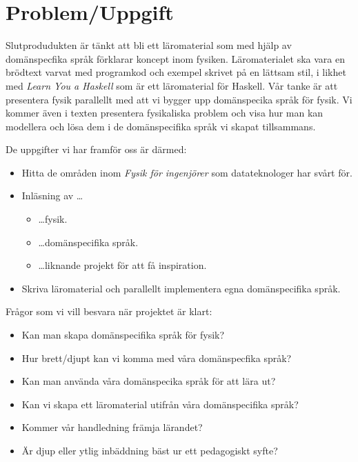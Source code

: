 \documentclass[12pt,a4paper]{article}
\begin{document}
\section{Problem/Uppgift}

Slutprodudukten är tänkt att bli ett läromaterial som med hjälp av domänspecfika språk förklarar koncept inom fysiken. Läromaterialet ska vara en brödtext varvat med programkod och exempel skrivet på en lättsam stil, i likhet med \textit{Learn You a Haskell}\cite{LYAH} som är ett läromaterial för Haskell. Vår tanke är att presentera fysik parallellt med att vi bygger upp domänspecika språk för fysik. Vi kommer även i texten presentera fysikaliska problem och visa hur man kan modellera och lösa dem i de domänspecifika språk vi skapat tillsammans.


De uppgifter vi har framför oss är därmed:

\begin{itemize}
	\item Hitta de områden inom \textit{Fysik för ingenjörer} som datateknologer har svårt för.
	\item Inläsning av \dots
	\begin{itemize}
		\item \dots fysik.
		\item \dots domänspecifika språk.
		\item \dots liknande projekt för att få inspiration.
	\end{itemize}
	\item Skriva läromaterial och parallellt implementera egna domänspecifika språk.
\end{itemize}


Frågor som vi vill besvara när projektet är klart:
\begin{itemize}
    \item Kan man skapa domänspecifika språk för fysik?
    \item Hur brett/djupt kan vi komma med våra domänspecfika språk?
    \item Kan man använda våra domänspecika språk för att lära ut?
    \item Kan vi skapa ett läromaterial utifrån våra domänspecifika språk?
    \item Kommer vår handledning främja lärandet?
    \item Är djup eller ytlig inbäddning bäst ur ett pedagogiskt syfte?
\end{itemize}
\end{document}
